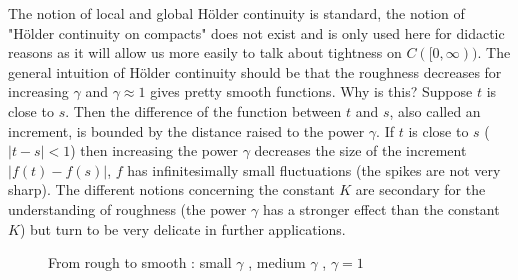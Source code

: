 The notion of local and global H\"older continuity is standard, the notion of "{}H\"older continuity on compacts"{} does not exist and is only used here for didactic reasons as it will allow us more easily to talk about tightness on $C([0,\infty))$. The general intuition of H\"older continuity should be that the roughness decreases for increasing $\gamma$ and $\gamma\approx 1$ gives pretty smooth functions. Why is this? Suppose $t$ is close to $s$. Then the difference of the function between $t$ and $s$, also called an increment, is bounded by the distance raised to the power $\gamma$. If $t$ is close to $s$ ($|t-s|<1$) then increasing the power $\gamma$ decreases the size of the increment $|f(t)-f(s)|$, $f$ has infinitesimally small fluctuations (the spikes are not very sharp). The different notions concerning the constant $K$ are secondary for the understanding of roughness (the power $\gamma$ has a stronger effect than the constant $K$) but turn to be very delicate in further applications. \begin{figure}[h]
	\begin{center}
   \caption*{From rough to smooth : small $\gamma$ , medium $\gamma$ , $\gamma=1$}
\end{center}
\end{figure}
